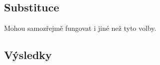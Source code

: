 \documentclass[10pt,a5paper]{article}
\theoremstyle{definition}
\def\vysld{}
\let\printvysl\relax
\def\substd{}
\let\endresults\relax
\begin{document}
\subsection*{Substituce}
Mohou samozřejmě fungovat i jiné než tyto volby.
\begin{multicols}{2}
\def\printsubst#1{\item $#1$}
\begin{enumerate}
    \substd
\end{enumerate}
\end{multicols}


\subsection*{Výsledky}
\begin{multicols}{2}
\def\printvysl#1{\item $#1$}
\begin{enumerate}
    \vysld
\end{enumerate}
\end{multicols}
\endresults
\end{document}

